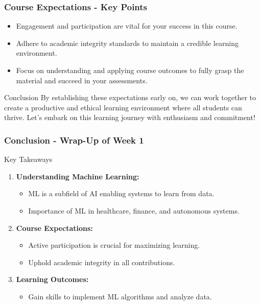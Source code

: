 \documentclass[aspectratio=169]{beamer}
\begin{document}
\begin{frame}[fragile]
    \frametitle{Course Expectations - Key Points}
    \begin{itemize}
        \item Engagement and participation are vital for your success in this course.
        \item Adhere to academic integrity standards to maintain a credible learning environment.
        \item Focus on understanding and applying course outcomes to fully grasp the material and succeed in your assessments.
    \end{itemize}
    \begin{block}{Conclusion}
        By establishing these expectations early on, we can work together to create a productive and ethical learning environment where all students can thrive. Let’s embark on this learning journey with enthusiasm and commitment!
    \end{block}
\end{frame}

\begin{frame}[fragile]
    \frametitle{Conclusion - Wrap-Up of Week 1}
    \begin{block}{Key Takeaways}
        \begin{enumerate}
            \item \textbf{Understanding Machine Learning:}
            \begin{itemize}
                \item ML is a subfield of AI enabling systems to learn from data.
                \item Importance of ML in healthcare, finance, and autonomous systems.
            \end{itemize}
            
            \item \textbf{Course Expectations:}
            \begin{itemize}
                \item Active participation is crucial for maximizing learning.
                \item Uphold academic integrity in all contributions.
            \end{itemize}

            \item \textbf{Learning Outcomes:}
            \begin{itemize}
                \item Gain skills to implement ML algorithms and analyze data.
            \end{itemize}
        \end{enumerate}
    \end{block}
\end{frame}
\end{document}
